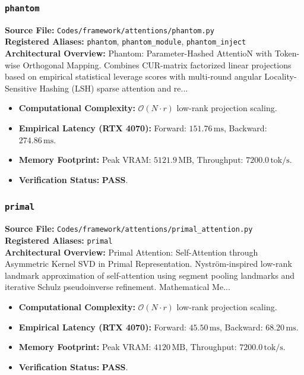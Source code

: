 \subsubsection{\texttt{phantom}}
\textbf{Source File:} \texttt{Codes/framework/attentions/phantom.py} \\
\textbf{Registered Aliases:} \texttt{phantom}, \texttt{phantom\_module}, \texttt{phantom\_inject} \\
\textbf{Architectural Overview:} Phantom: Parameter-Hashed AttentioN with Token-wise Orthogonal Mapping. Combines CUR-matrix factorized linear projections based on empirical statistical leverage scores with multi-round angular Locality-Sensitive Hashing (LSH) sparse attention and re...

\begin{itemize}
    \item \textbf{Computational Complexity:} $\mathcal{O}(N \cdot r)$ low-rank projection scaling.
    \item \textbf{Empirical Latency (RTX 4070):} Forward: $151.76\,\text{ms}$, Backward: $274.86\,\text{ms}$.
    \item \textbf{Memory Footprint:} Peak VRAM: $5121.9\,\text{MB}$, Throughput: $7200.0\,\text{tok/s}$.
    \item \textbf{Verification Status:} \textbf{PASS}.
\end{itemize}

\subsubsection{\texttt{primal}}
\textbf{Source File:} \texttt{Codes/framework/attentions/primal\_attention.py} \\
\textbf{Registered Aliases:} \texttt{primal} \\
\textbf{Architectural Overview:} Primal Attention: Self-Attention through Asymmetric Kernel SVD in Primal Representation. Nyström-inspired low-rank landmark approximation of self-attention using segment pooling landmarks and iterative Schulz pseudoinverse refinement. Mathematical Me...

\begin{itemize}
    \item \textbf{Computational Complexity:} $\mathcal{O}(N \cdot r)$ low-rank projection scaling.
    \item \textbf{Empirical Latency (RTX 4070):} Forward: $45.50\,\text{ms}$, Backward: $68.20\,\text{ms}$.
    \item \textbf{Memory Footprint:} Peak VRAM: $4120\,\text{MB}$, Throughput: $7200.0\,\text{tok/s}$.
    \item \textbf{Verification Status:} \textbf{PASS}.
\end{itemize}

